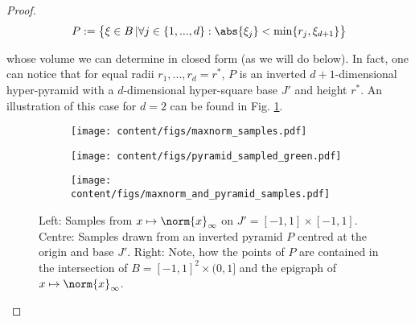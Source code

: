 \begin{lem}
\begin{proof}
\[P:=\bigl\{ \xi \in B \, \vert  \forall  j \in \{1,...,d\} :\abs{\xi_j} < \min\{r_j,\xi_{d+1}\}   \bigr\}\]

%
whose volume we can determine in closed form (as we will do below). In fact, one can notice that for equal radii $r_1,...,r_d = r^*$, $P$ is an inverted $d+1$-dimensional hyper-pyramid with a $d$-dimensional hyper-square base $J'$ and height $r^*$. 
An illustration of this case for $d=2$ can be found in Fig. \ref{fig:pyramid_samples}.

%
%
%



\begin{figure*}
        \centering
        \begin{subfigure}
                \centering
                \texttt{[image: content/figs/maxnorm\_samples.pdf]}
        \end{subfigure}%
        \begin{subfigure}
                \centering
                \texttt{[image: content/figs/pyramid\_sampled\_green.pdf]}
        \end{subfigure}
        \begin{subfigure}
                \centering
                \texttt{[image: content/figs/maxnorm\_and\_pyramid\_samples.pdf]}
        \end{subfigure}
       \caption{Left: Samples from $x \mapsto \norm{x}_{\infty}$ on  $J' =[-1,1] \times [-1,1]$. Centre: Samples drawn from an inverted pyramid $P$ centred at the origin and base $J'$. Right: Note, how the points of $P$ are contained in the intersection of $B =[-1,1]^2 \times (0,1]$ and the epigraph of $x \mapsto \norm{x}_{\infty}$. }
       \label{fig:pyramid_samples}
\end{figure*}	



\end{proof}
\end{lem}
